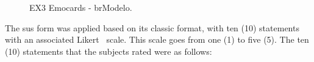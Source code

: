 \begin{figure}[!htb]
    \centering
    \caption{EX3 Emocards - brModelo.}
    \label{fig:Emocards3_alt}
    
\end{figure}

The \ac{sus} form was applied based on its classic format, with ten (10) statements with an associated Likert~\cite{Likert} scale.
This scale goes from one (1) to five (5).
The ten (10) statements that the subjects rated were as follows:


